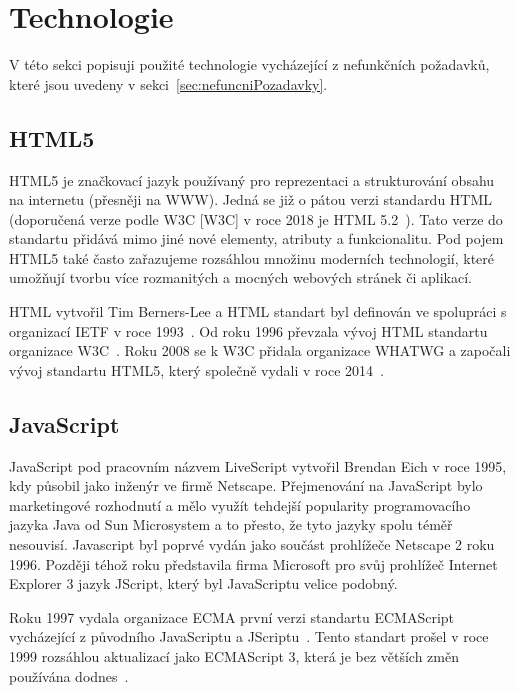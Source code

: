
\section{Technologie}\label{sec:technologie}
V této sekci popisuji použité technologie vycházející z nefunkčních požadavků, které jsou uvedeny v sekci~\ref{sec:nefuncniPozadavky}.

\subsection{HTML5}\label{subsec:html5}

HTML5 je značkovací jazyk používaný pro reprezentaci a strukturování  obsahu na internetu (přesněji na \acrshort{WWW}).
Jedná se již o pátou verzi standardu \gls{HTML} (doporučená verze podle \acrlong{W3C} [\acrshort{W3C}] v roce 2018 je HTML 5.2~\cite{w3c:html52}).
Tato verze do standartu přidává mimo jiné nové elementy, atributy a funkcionalitu.
Pod pojem HTML5 také často zařazujeme rozsáhlou množinu moderních technologií, které umožňují tvorbu více rozmanitých a mocných webových stránek či aplikací.~\cite{mozzila:html5}

\gls{HTML} vytvořil Tim Berners-Lee a \gls{HTML} standart byl definován ve spolupráci s organizací \gls{IETF} v roce 1993~\cite{html:autor}.
Od roku 1996 převzala vývoj \gls{HTML} standartu organizace \gls{W3C}~\cite{w3c:html32}.
Roku 2008 se k \gls{W3C} přidala organizace \gls{WHATWG} a započali vývoj standartu HTML5, který společně vydali v roce 2014~\cite{w3c:html5}.

\subsection{JavaScript}\label{subsec:javascript}

JavaScript pod pracovním názvem LiveScript vytvořil Brendan Eich v roce 1995, kdy působil jako inženýr ve firmě Netscape.
Přejmenování na JavaScript bylo marketingové rozhodnutí a mělo využít tehdejší popularity programovacího jazyka Java od Sun Microsystem a to přesto, že tyto jazyky spolu téměř nesouvisí.
Javascript byl poprvé vydán jako součást prohlížeče Netscape 2 roku 1996.
Později téhož roku představila firma Microsoft pro svůj prohlížeč Internet Explorer 3 jazyk JScript, který byl JavaScriptu velice podobný.~\cite{mozzila:javascript}

Roku 1997 vydala organizace \gls{ECMA} první verzi standartu ECMAScript vycházející z původního JavaScriptu a JScriptu~\cite{ecma:ecmascript1}.
Tento standart prošel v roce 1999 rozsáhlou aktualizací jako ECMAScript 3, která je bez větších změn používána dodnes~\cite{mozzila:javascript}.

